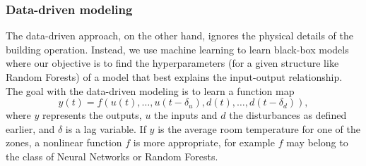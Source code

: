 \subsubsection{Data-driven modeling}
The data-driven approach, on the other hand, ignores the physical details of the building operation. Instead, we use machine learning to learn black-box models where our objective is to find the hyperparameters (for a given structure like Random Forests) of a model that best explains the input-output relationship.
\\

The goal with the data-driven modeling is to learn a function map
\begin{equation}
y(t) = f(u(t),\dots,u(t-\delta_u), d(t),\dots, d(t-\delta_d)),
\end{equation}
where \(y\) represents the outputs, \(u\) the inputs and \(d\) the disturbances as defined earlier, and \(\delta\) is a lag variable. If \(y\) is the average room temperature for one of the zones, a nonlinear function \(f\) is more appropriate, for example \(f\) may belong to the class of Neural Networks or Random Forests.
\\

